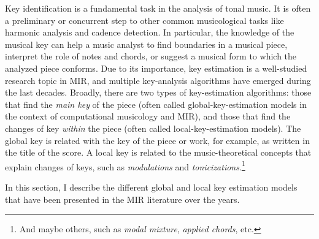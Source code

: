 

Key identification is a fundamental task in the analysis of
tonal music. It is often a preliminary or concurrent step to
other common musicological tasks like harmonic analysis and
cadence detection. In particular, the knowledge of the
musical key can help a music analyst to find boundaries in a
musical piece, interpret the role of notes and chords, or
suggest a musical form to which the analyzed piece conforms.
Due to its importance, key estimation is a well-studied
research topic in MIR, and multiple key-analysis algorithms
have emerged during the last decades. Broadly, there are two
types of key-estimation algorithms: those that find the
\emph{main key} of the piece (often called
global-key-estimation models in the context of computational
musicology and MIR), and those that find the changes of key
\emph{within} the piece (often called local-key-estimation
models). The global key is related with the key of the piece
or work, for example, as written in the title of the score.
A local key is related to the music-theoretical concepts
that explain changes of keys, such as \emph{modulations} and
\emph{tonicizations}.\footnote{And maybe others, such as
\emph{modal mixture}, \emph{applied chords}, etc.}

In this section, I describe the different global and local
key estimation models that have been presented in the MIR
literature over the years.
